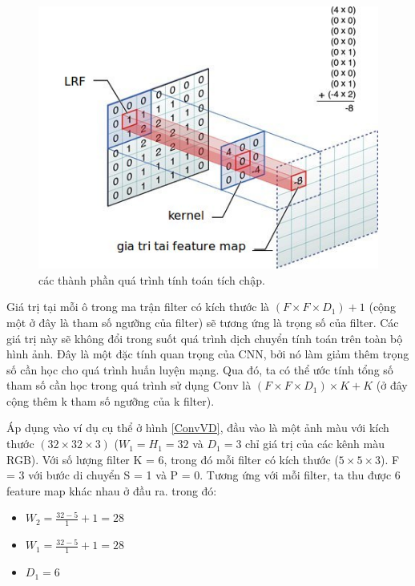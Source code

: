 \begin{figure}[ht]
  			\begin{center}
    				\includegraphics[scale=0.6]{parConv} 
    				\caption[Caption for LOF]{các thành phần quá trình tính toán tích chập.\protect\footnotemark}
    				\label{Conv4}
  			\end{center}
\end{figure}	

 	Giá trị tại mỗi ô trong ma trận filter có kích thước là $(F \times F \times D_1) + 1$ (cộng một ở đây là tham số ngưỡng của filter) sẽ tương ứng là trọng số của filter. Các giá trị này sẽ không đổi trong suốt quá trình dịch chuyển tính toán trên toàn bộ hình ảnh. Đây là một đặc tính quan trọng của CNN, bởi nó làm giảm thêm trọng số cần học cho quá trình huấn luyện mạng. Qua đó, ta có thể ước tính tổng số tham số cần học trong quá trình sử dụng Conv là $(F \times F \times D_1) \times K + K$ (ở đây cộng thêm k tham số ngưỡng của k filter). \par
 	



 Áp dụng vào ví dụ cụ thể ở hình \ref{ConvVD}, đầu vào là một ảnh màu với kích thước $(32 \times 32 \times 3)$ ($W_1 = H_1 = 32$ và $D_1 = 3$ chỉ giá trị của các kênh màu RGB). Với số lượng filter K = 6, trong đó mỗi filter có kích thước ($5 \times 5 \times 3$). F = 3 với bước di chuyển S = 1 và P = 0. Tương ứng với mỗi filter, ta thu được 6 feature map khác nhau ở đầu ra. trong đó:
 \begin{itemize}
 	\item $W_2 = \frac{32 - 5}{1} + 1 = 28$
 	\item $W_1 = \frac{32 - 5}{1} + 1 = 28$
 	\item $D_1 = 6$ 	
 \end{itemize}

